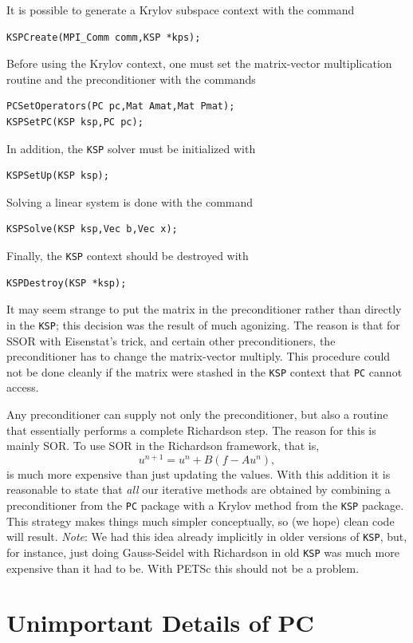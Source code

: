 {{{It is possible to generate a Krylov subspace context with the
command
\begin{lstlisting}
KSPCreate(MPI_Comm comm,KSP *kps);
\end{lstlisting}
Before using the Krylov context, one must set the matrix-vector multiplication routine and
the preconditioner with the
commands
\begin{lstlisting}
PCSetOperators(PC pc,Mat Amat,Mat Pmat);
KSPSetPC(KSP ksp,PC pc);
\end{lstlisting}
In addition, the \lstinline{KSP} solver must be initialized with
\begin{lstlisting}
KSPSetUp(KSP ksp);
\end{lstlisting}
Solving a linear system is done with the command
\begin{lstlisting}
KSPSolve(KSP ksp,Vec b,Vec x);
\end{lstlisting}
Finally, the \lstinline{KSP} context should be destroyed with
\begin{lstlisting}
KSPDestroy(KSP *ksp);
\end{lstlisting}

It may seem strange to put the matrix in the preconditioner rather
than directly in the \lstinline{KSP}; this decision was the result of much
agonizing. The reason is that for SSOR with Eisenstat's trick, and
certain other preconditioners, the
preconditioner has to change the matrix-vector multiply.  This
procedure could not
be done cleanly if the matrix were stashed in the \lstinline{KSP} context that
\lstinline{PC} cannot access.

Any preconditioner can supply not
only the preconditioner, but also a routine that essentially performs a
complete Richardson step. The reason for this is mainly SOR. To
use SOR in the Richardson framework, that is,
\[
  u^{n+1} = u^{n} + B(f - A u^{n}),
\]
is much more expensive than just updating the values.
With this addition it is reasonable to state that {\em all} our
iterative methods are obtained by combining a preconditioner from
the \lstinline{PC} package with a Krylov method from the \lstinline{KSP}
package. This strategy makes things much simpler conceptually, so
(we hope)
clean code will result. {\em Note}: We had this idea already implicitly in
older versions of \lstinline{KSP}, but, for instance, just doing Gauss-Seidel
with Richardson in old \lstinline{KSP} was much more expensive than it had to be.
With PETSc this should not be a problem.

\section{Unimportant Details of PC}

}}}
